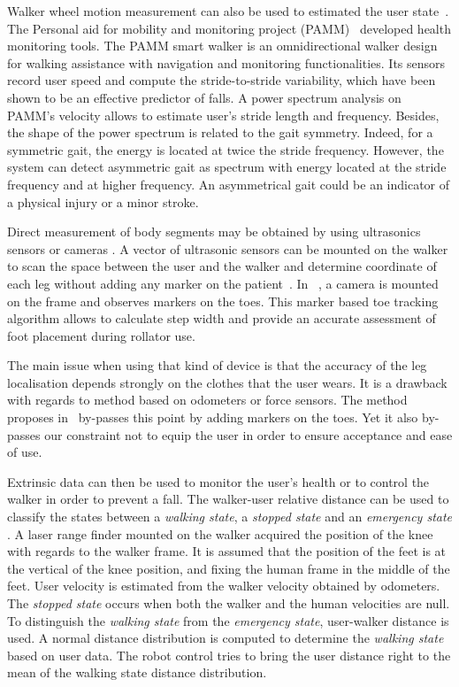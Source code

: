 \documentclass[letterpaper, 10 pt, conference]{ieeeconf}
\begin{document}
Walker wheel motion measurement can also be used to estimated the user state~\cite{Spenko06,Merlet10b}. The Personal aid for mobility and monitoring project (PAMM)~\cite{Spenko06} developed health monitoring tools. The PAMM smart walker is an omnidirectional walker design for walking assistance with navigation and monitoring functionalities. Its sensors record user speed and compute the stride-to-stride variability, which have been shown to be an effective predictor of falls. A power spectrum analysis on PAMM's velocity allows to estimate user's stride length and frequency. Besides, the shape of the power spectrum is related to the gait symmetry. Indeed, for a symmetric gait, the energy is located at twice the stride frequency. However, the system can detect asymmetric gait as spectrum with energy located at the stride frequency and at higher frequency. An asymmetrical gait could be an indicator of a physical injury or a minor stroke.

Direct measurement of body segments may be obtained by using ultrasonics sensors or cameras \cite{Frizera08,Chee09}. A vector of ultrasonic sensors can be mounted on the walker to scan the space between the user and the walker and determine coordinate of each leg without adding any marker on the patient~\cite{Frizera08}. In ~\cite{Chee09}, a camera is mounted on the frame and observes markers on the toes. This marker based toe tracking algorithm allows to calculate step width and provide an accurate assessment of foot placement during rollator use.
  
The main issue when using that kind of device is that the accuracy of the leg localisation depends strongly on the clothes that the user wears. It is a drawback with regards to method based on odometers or force sensors. The method proposes in~\cite{Chee09} by-passes this point by adding markers on the toes. Yet it also by-passes our constraint not to equip the user in order to ensure acceptance and ease of use.

Extrinsic data can then be used to monitor the user's health or to control the walker in order to prevent a fall. The walker-user relative distance can be used to classify the states between a \textit{walking state}, a \textit{stopped state }and an \textit{emergency state} \cite{Hirata2006}. A laser range finder mounted on the walker acquired the position of the knee with regards to the walker frame. It is assumed that the position of the feet is at the vertical of the knee position, and fixing the human frame in the middle of the feet. User velocity is estimated from the walker velocity obtained by odometers. The\textit{ stopped state} occurs when both the walker and the human velocities are null. To distinguish the \textit{walking state} from the \textit{emergency state}, user-walker distance is used.  A normal distance distribution is computed to determine the  \textit{walking state} based on user data. The robot control tries to bring the user distance right to the mean of the  walking state distance distribution.
\end{document}
